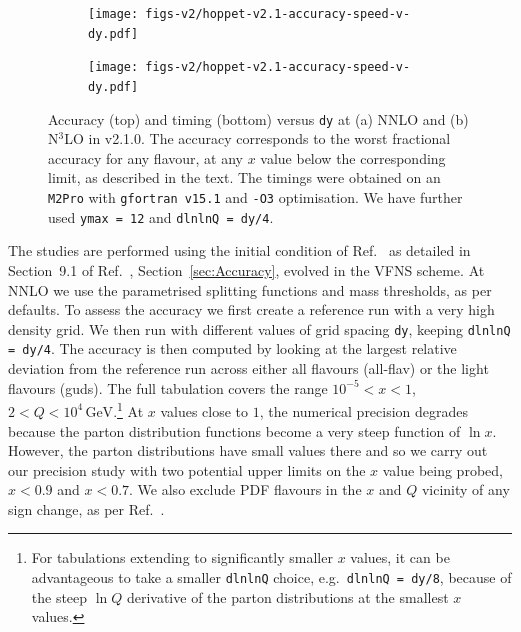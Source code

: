 \begin{figure}[htbp]
    \centering
    \begin{subfigure}{0.49\textwidth}
        \centering
        \texttt{[image: figs-v2/hoppet-v2.1-accuracy-speed-v-dy.pdf]}
        \caption{}
        \label{fig:main-sub1}
    \end{subfigure}
    \hfill
    \begin{subfigure}{0.49\textwidth}
        \centering
        \texttt{[image: figs-v2/hoppet-v2.1-accuracy-speed-v-dy.pdf]}
        \caption{}
        \label{fig:main-sub2}
    \end{subfigure}
    \caption{Accuracy (top) and timing (bottom) versus \texttt{dy} at
      (a) NNLO and (b) N$^3$LO in \hoppet{} v2.1.0.
      The accuracy corresponds to the worst fractional accuracy for any flavour,
      at any $x$ value below the corresponding limit, as described in
      the text.
      The timings were
      obtained on an \texttt{M2Pro} with \texttt{gfortran v15.1} and
      \texttt{-O3} optimisation. We have further used \texttt{ymax = 12} and
      \texttt{dlnlnQ = dy/4}.
    }
    \label{fig:main}
\end{figure}

The studies are performed using the initial condition of
Ref.~\cite{Dittmar:2005ed} as detailed in
%
\ifreleasenote
Section~9.1 of Ref.~\cite{Salam:2008qg},
\else
Section~\ref{sec:Accuracy},
\fi
%
evolved in the VFNS scheme.
%
At NNLO we use the parametrised splitting
functions and mass thresholds, as per \hoppet defaults.
%
To
assess the accuracy we first create a reference run with a very high
density grid. We then run \hoppet{} with different values of grid
spacing \texttt{dy}, keeping \texttt{dlnlnQ = dy/4}.
%
The accuracy is then computed by looking at the largest relative
deviation from the reference run across either all flavours (all-flav)
or the light flavours (guds).
%
The full tabulation covers the range $10^{-5} < x < 1$,
$2 < Q < 10^4\, \text{GeV}$.\footnote{For tabulations extending to
  significantly smaller $x$ values, it can be advantageous to take a
  smaller \texttt{dlnlnQ} choice, e.g.\ \texttt{dlnlnQ = dy/8},
  because of the steep $\ln Q$ derivative of the parton
  distributions at the smallest $x$ values.}
%
At $x$ values close to $1$, the numerical precision degrades because the
parton distribution functions become a very steep function of $\ln
x$.
%
However, the parton distributions have small values there and so we
carry out our precision study with two potential upper limits on the
$x$ value being probed, $x < 0.9$ and $x < 0.7$.
%
We also exclude PDF flavours in the $x$ and $Q$ vicinity of any sign
change, as per Ref.~\cite{Salam:2008qg}.

